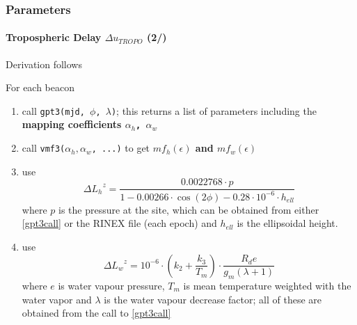 \documentclass{beamer}
\begin{document}
\begin{frame}\frametitle{Parameters}\framesubtitle{Tropospheric Delay \(\Delta u_{TROPO}\) (2/)}
Derivation follows \cite{Landskron2018}

For each beacon
\begin{enumerate}[label=\textbf{T.\arabic*},ref=T.\arabic*]
  \item \label{gpt3call} call \texttt{gpt3(mjd, $\phi$, $\lambda$)}; this returns a 
  list of parameters including the \textbf{mapping coefficients \texttt{$\alpha _h$, $\alpha _w$}}
  
  \item call \texttt{vmf3(\(\alpha _h, \alpha _w\), ...)} to get \textbf{\(mf_h(\epsilon)\) and \(mf_w(\epsilon)\)}
  
  \item use \begin{equation*}
    \Delta {L_{h}}^{z} = \frac{0.0022768 \cdot p}{1-0.00266 \cdot \cos(2\phi) - 0.28 \cdot 10^{-6} \cdot h_{ell}}
  \end{equation*}
  where $p$ is the pressure at the site, which can be obtained from either \ref{gpt3call} 
  or the RINEX file (each epoch) and $h_{ell}$ is the ellipsoidal height.
  
  \item use \begin{equation*}
    \Delta {L_{w}}^{z} = 10^{-6} \cdot ( k_2 + \frac{k_3}{T_m}) \cdot \frac{R_d e}{g_m (\lambda +1)}
  \end{equation*}
  where $e$ is water vapour pressure, $T_m$ is mean 
  temperature weighted with the water vapor and $\lambda$ is the water vapour 
  decrease factor; all of these are obtained from the call to \ref{gpt3call}
\end{enumerate}

\end{frame}
\end{document}
